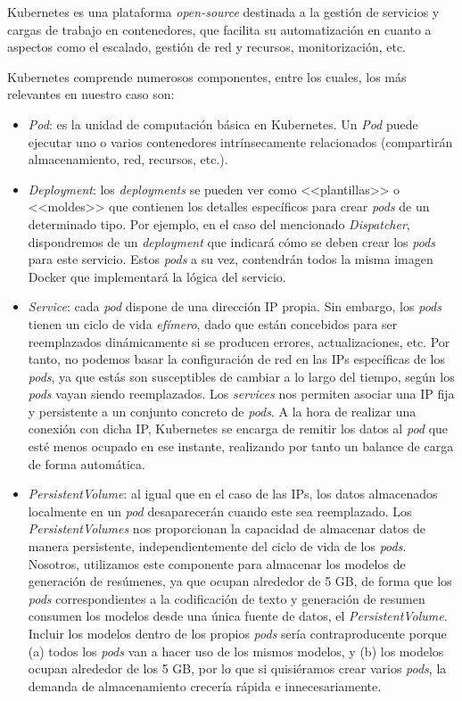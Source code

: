 Kubernetes es una plataforma \emph{open-source} destinada a la gestión de servicios y cargas de trabajo en contenedores, que facilita su automatización en cuanto a aspectos como el escalado, gestión de red y recursos, monitorización, etc. \cite{kubernetes}

Kubernetes comprende numerosos componentes, entre los cuales, los más relevantes en nuestro caso son:

\vspace{-0.5cm}
\begin{itemize}
	\item [\textbullet] \emph{Pod}: es la unidad de computación básica en Kubernetes. Un \emph{Pod} puede ejecutar uno o varios contenedores intrínsecamente relacionados (compartirán almacenamiento, red, recursos, etc.). 
	\item [\textbullet] \emph{Deployment}: los \emph{deployments} se pueden ver como <<plantillas>> o <<moldes>> que contienen los detalles específicos para crear \emph{pods} de un determinado tipo. Por ejemplo, en el caso del mencionado \emph{Dispatcher}, dispondremos de un \emph{deployment} que indicará cómo se deben crear los \emph{pods} para este servicio. Estos \emph{pods} a su vez, contendrán todos la misma imagen Docker que implementará la lógica del servicio.
	\item [\textbullet] \emph{Service}: cada \emph{pod} dispone de una dirección IP propia. Sin embargo, los \emph{pods} tienen un ciclo de vida \emph{efímero}, dado que están concebidos para ser reemplazados dinámicamente si se producen errores, actualizaciones, etc. Por tanto, no podemos basar la configuración de red en las IPs específicas de los \emph{pods}, ya que estás son susceptibles de cambiar a lo largo del tiempo, según los \emph{pods} vayan siendo reemplazados. Los \emph{services} nos permiten asociar una IP fija y persistente a un conjunto concreto de \emph{pods}. A la hora de realizar una conexión con dicha IP, Kubernetes se encarga de remitir los datos al \emph{pod} que esté menos ocupado en ese instante, realizando por tanto un balance de carga de forma automática.
	
	\item [\textbullet] \emph{PersistentVolume}: al igual que en el caso de las IPs, los datos almacenados localmente en un \emph{pod} desaparecerán cuando este sea reemplazado. Los \emph{PersistentVolumes} nos proporcionan la capacidad de almacenar datos de manera persistente, independientemente del ciclo de vida de los \emph{pods}. Nosotros, utilizamos este componente para almacenar los modelos de generación de resúmenes, ya que ocupan alrededor de 5 GB, de forma que los \emph{pods} correspondientes a la codificación de texto y generación de resumen consumen los modelos desde una única fuente de datos, el \emph{PersistentVolume}. Incluir los modelos dentro de los propios \emph{pods} sería contraproducente porque (a) todos los \emph{pods} van a hacer uso de los mismos modelos, y (b) los modelos ocupan alrededor de los 5 GB, por lo que si quisiéramos crear varios \emph{pods}, la demanda de almacenamiento crecería rápida e innecesariamente.
\end{itemize}

